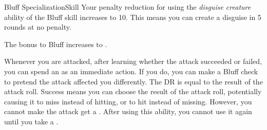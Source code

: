 \begin{feat}{Bluff Specialization}{Skill}
         Your penalty reduction for using the \textit{disguise creature} ability of the Bluff skill increases to 10.
        This means you can create a disguise in 5 rounds at no penalty.

         The bonus to Bluff increases to .

         Whenever you are attacked, after learning whether the attack succeeded or failed, you can spend an  as an immediate action.
        If you do, you can make a Bluff check to pretend the attack affected you differently.
        The DR is equal to the result of the attack roll.
        Success means you can choose the result of the attack roll, potentially causing it to miss instead of hitting, or to hit instead of missing.
        However, you cannot make the attack get a .
        After using this ability, you cannot use it again until you take a .
    \end{feat}

